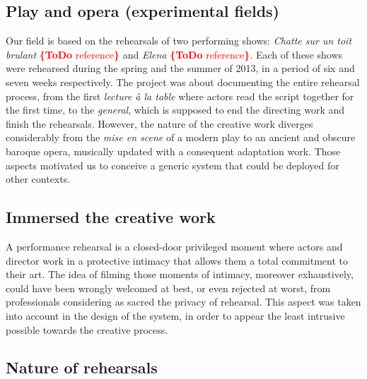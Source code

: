 \documentclass[conference]{IEEEtran}
\newcommand{\todo}[1]{\noindent\textcolor{red}{{\bf \{ToDo} #1{\bf \}}}}
\begin{document}
\subsection{Play and opera (experimental fields)}

Our field is based on the rehearsals of two performing shows: \emph{Chatte sur un toit brulant} \todo{reference} and \emph{Elena} \todo{reference}.
Each of these shows were rehearsed during the spring and the summer of 2013, in a period of six and seven weeks respectively. The project was about documenting the entire rehearsal process, from the first \emph{lecture à la table} where actors read the script together for the first time, to the \emph{general}, which is supposed to end the directing work and finish the rehearsals.
However, the nature of the creative work diverges considerably from the \emph{mise en scene} of a modern play to an ancient and obscure baroque opera, musically updated with a consequent adaptation work.
Those aspects motivated us to conceive a generic system that could be deployed for other contexts.

\subsection{Immersed the creative work}

A performance rehearsal is a closed-door privileged moment where actors and director work in a protective intimacy that allows them a total commitment to their art. The idea of filming those moments of intimacy, moreover exhaustively, could have been wrongly welcomed at best, or even rejected at worst, from professionals considering as sacred the privacy of rehearsal.
This aspect was taken into account in the design of the system, in order to appear the least intrusive possible towards the creative process.

\subsection{Nature of rehearsals}
\end{document}
